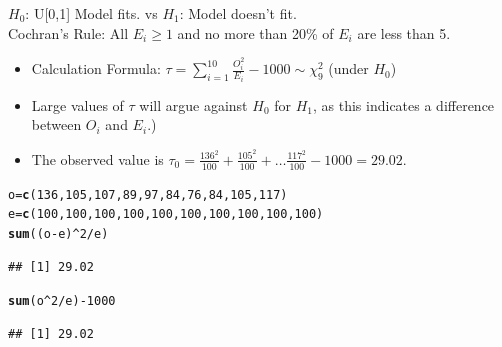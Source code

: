 \documentclass[t,xcolor=pdftex,dvipsnames,table]{beamer}\usepackage[]{graphicx}\usepackage[]{color}
\makeatletter
\newcommand{\hlnum}[1]{\textcolor[rgb]{0.686,0.059,0.569}{#1}}%
\newcommand{\hlopt}[1]{\textcolor[rgb]{0,0,0}{#1}}%
\newcommand{\hlstd}[1]{\textcolor[rgb]{0.345,0.345,0.345}{#1}}%
\newcommand{\hlkwb}[1]{\textcolor[rgb]{0.69,0.353,0.396}{#1}}%
\newcommand{\hlkwd}[1]{\textcolor[rgb]{0.737,0.353,0.396}{\textbf{#1}}}%
\newenvironment{kframe}{%
 \def\at@end@of@kframe{}%
 \ifinner\ifhmode%
  \def\at@end@of@kframe{\end{minipage}}%
  \begin{minipage}{\columnwidth}%
 \fi\fi%
 \def\FrameCommand##1{\hskip\@totalleftmargin \hskip-\fboxsep
 \colorbox{shadecolor}{##1}\hskip-\fboxsep
     \hskip-\linewidth \hskip-\@totalleftmargin \hskip\columnwidth}%
 \MakeFramed {\advance\hsize-\width
   \@totalleftmargin\z@ \linewidth\hsize
   \@setminipage}}%
 {\par\unskip\endMakeFramed%
 \at@end@of@kframe}
\newenvironment{knitrout}{}{} %
\makeatother
\begin{document}
\begin{frame}[fragile]{}

 $H_{0}$: U[0,1] Model fits. vs $H_{1}$: Model doesn't fit. \\

 Cochran's Rule: All $E_{i} \geq 1$ and no more than 20\% of $E_{i}$ are less than 5. 

\begin{itemize}
\item Calculation Formula: $\tau = \sum_{i=1}^{10} \frac{O_{i}^2}{E_{i}} - 1000 \sim \chi^2_{9}$ (under $H_{0}$)
\item Large values of $\tau$ will argue against $H_{0}$ for $H_{1}$, as this indicates a difference between $O_{i}$ and $E_{i}$.)
\item The observed value is $\tau_{0} = \frac{136^2}{100} + \frac{105^2}{100} + \ldots \frac{117^2}{100} - 1000 = 29.02$. 
\end{itemize}

\begin{knitrout}
\color{fgcolor}\begin{kframe}
\begin{alltt}
\hlstd{o}\hlkwb{=}\hlkwd{c}\hlstd{(}\hlnum{136}\hlstd{,}\hlnum{105}\hlstd{,}\hlnum{107}\hlstd{,}\hlnum{89}\hlstd{,}\hlnum{97}\hlstd{,}\hlnum{84}\hlstd{,}\hlnum{76}\hlstd{,}\hlnum{84}\hlstd{,}\hlnum{105}\hlstd{,}\hlnum{117}\hlstd{)}
\hlstd{e}\hlkwb{=}\hlkwd{c}\hlstd{(}\hlnum{100}\hlstd{,}\hlnum{100}\hlstd{,}\hlnum{100}\hlstd{,}\hlnum{100}\hlstd{,}\hlnum{100}\hlstd{,}\hlnum{100}\hlstd{,}\hlnum{100}\hlstd{,}\hlnum{100}\hlstd{,}\hlnum{100}\hlstd{,}\hlnum{100}\hlstd{)}
\hlkwd{sum}\hlstd{((o}\hlopt{-}\hlstd{e)}\hlopt{^}\hlnum{2}\hlopt{/}\hlstd{e)}
\end{alltt}
\begin{verbatim}
## [1] 29.02
\end{verbatim}
\begin{alltt}
\hlkwd{sum}\hlstd{(o}\hlopt{^}\hlnum{2}\hlopt{/}\hlstd{e)} \hlopt{-} \hlnum{1000}
\end{alltt}
\begin{verbatim}
## [1] 29.02
\end{verbatim}
\end{kframe}
\end{knitrout}
\end{frame} 
\end{document}

